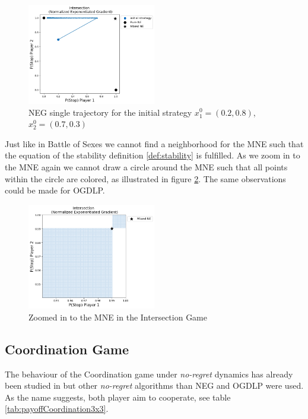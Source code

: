 \begin{figure}[H]
    \centering
    \includegraphics[width=0.5\textwidth]{logos/Intersection5.png}
    \caption{NEG single trajectory for the initial strategy $x_{1}^{0} = (0.2,0.8)$, $x_{2}^{0} = (0.7,0.3)$}
    \label{fig:Intersection5}
\end{figure}

Just like in Battle of Sexes we cannot find a neighborhood for the MNE such that the equation of the stability definition \ref{def:stability} is fulfilled. As we zoom in to the MNE again we cannot draw a circle around the MNE such that all points within the circle are colored, as illustrated in figure \ref{fig:Intersection6}. The same observations could be made for OGDLP. 

\begin{figure}[H]
    \centering
    \includegraphics[width=0.5\textwidth]{logos/Intersection6.png}
    \caption{Zoomed in to the MNE in the Intersection Game}
    \label{fig:Intersection6}
\end{figure}


\subsection{Coordination Game}\label{subsection:coordinationGame}

The behaviour of the Coordination game under \textit{no-regret} dynamics has already been studied in \cite{jafari} but other \textit{no-regret} algorithms than NEG and OGDLP were used. As the name suggests, both player aim to cooperate, see table \ref{tab:payoffCoordination3x3}. 

